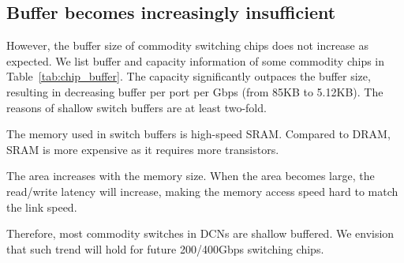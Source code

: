 \subsection{Buffer becomes increasingly insufficient}\label{sec:buffersize}
However, the buffer size of commodity switching chips does not increase as expected. We list buffer and capacity information of some commodity chips in Table~\ref{tab:chip_buffer}. The capacity significantly outpaces the buffer size, resulting in decreasing buffer per port per Gbps (from 85KB to 5.12KB). The reasons of shallow switch buffers are at least two-fold.
\vspace{-1mm}
\begin{ecompact}
\item The memory used in switch buffers is high-speed SRAM. Compared to DRAM, SRAM is more expensive as it requires more transistors.
\vspace{-1mm}
\item The area increases with the memory size. When the area becomes large, the read/write latency will increase, making the memory access speed hard to match the link speed.
\end{ecompact}
Therefore, most commodity switches in DCNs are shallow buffered. We envision that such trend will hold for future 200/400Gbps switching chips.
